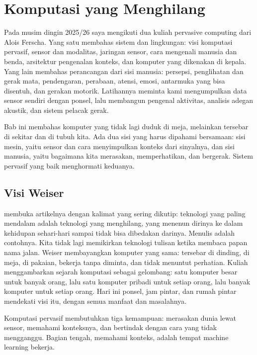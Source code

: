 \chapter{Komputasi yang Menghilang}
\label{ch:pervasif}

Pada musim dingin 2025/26 saya mengikuti dua kuliah pervasive computing dari Alois Ferscha. Yang satu
membahas sistem dan lingkungan: visi komputasi pervasif, sensor dan modalitas, jaringan sensor, cara
mengenali manusia dan benda, arsitektur pengenalan konteks, dan komputer yang dikenakan di kepala. Yang lain
membahas perancangan dari sisi manusia: persepsi, penglihatan dan gerak mata, pendengaran, perabaan, atensi,
emosi, antarmuka yang bisa disentuh, dan gerakan motorik. Latihannya meminta kami mengumpulkan data sensor
sendiri dengan ponsel, lalu membangun pengenal aktivitas, analisis adegan akustik, dan sistem pelacak gerak.

Bab ini membahas komputer yang tidak lagi duduk di meja, melainkan tersebar di sekitar dan di tubuh kita.
Ada dua sisi yang harus dipahami bersamaan: sisi mesin, yaitu sensor dan cara menyimpulkan konteks dari
sinyalnya, dan sisi manusia, yaitu bagaimana kita merasakan, memperhatikan, dan bergerak. Sistem pervasif yang
baik menghormati keduanya.

\section{Visi Weiser}

\citet{weiser1991} membuka artikelnya dengan kalimat yang sering dikutip: teknologi yang paling mendalam adalah
teknologi yang menghilang, yang menenun dirinya ke dalam kehidupan sehari-hari sampai tidak bisa dibedakan
darinya. Menulis adalah contohnya. Kita tidak lagi memikirkan teknologi tulisan ketika membaca papan nama jalan.
Weiser membayangkan komputer yang sama: tersebar di dinding, di meja, di pakaian, bekerja tanpa diminta, dan
tidak menuntut perhatian. Kuliah menggambarkan sejarah komputasi sebagai gelombang: satu komputer besar untuk
banyak orang, lalu satu komputer pribadi untuk setiap orang, lalu banyak komputer untuk setiap orang. Hari ini
ponsel, jam pintar, dan rumah pintar mendekati visi itu, dengan semua manfaat dan masalahnya.

Komputasi pervasif membutuhkan tiga kemampuan: merasakan dunia lewat sensor, memahami konteksnya, dan bertindak
dengan cara yang tidak mengganggu. Bagian tengah, memahami konteks, adalah tempat machine learning bekerja.

